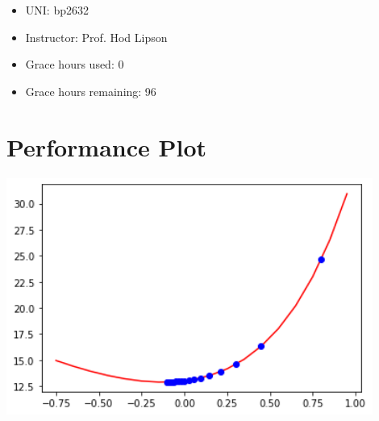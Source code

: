 \documentclass[twoside,11pt]{homework}
\date{September 17, 2023} %
\begin{document}
\maketitle
\begin{itemize}
    \item UNI: bp2632
    \item Instructor: Prof. Hod Lipson
    \item Grace hours used: 0 
    \item Grace hours remaining: 96
\end{itemize}
\newpage


\section*{Performance Plot}

\includegraphics[width=0.9\textwidth]{output.png}
\end{document}
